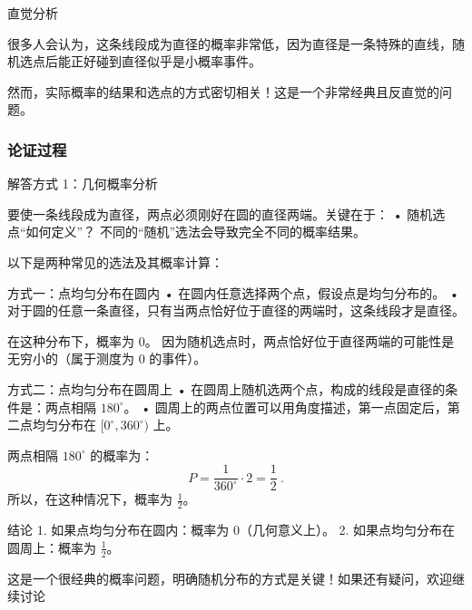 直觉分析

很多人会认为，这条线段成为直径的概率非常低，因为直径是一条特殊的直线，随机选点后能正好碰到直径似乎是小概率事件。

然而，实际概率的结果和选点的方式密切相关！这是一个非常经典且反直觉的问题。


\subsubsection{论证过程}
解答方式 1：几何概率分析

要使一条线段成为直径，两点必须刚好在圆的直径两端。关键在于：
	•	随机选点“如何定义”？
不同的“随机”选法会导致完全不同的概率结果。

以下是两种常见的选法及其概率计算：

方式一：点均匀分布在圆内
	•	在圆内任意选择两个点，假设点是均匀分布的。
	•	对于圆的任意一条直径，只有当两点恰好位于直径的两端时，这条线段才是直径。

在这种分布下，概率为 0。
因为随机选点时，两点恰好位于直径两端的可能性是无穷小的（属于测度为 0 的事件）。

方式二：点均匀分布在圆周上
	•	在圆周上随机选两个点，构成的线段是直径的条件是：两点相隔 $180^\circ$。
	•	圆周上的两点位置可以用角度描述，第一点固定后，第二点均匀分布在 $[0^\circ, 360^\circ)$ 上。

两点相隔 $180^\circ$ 的概率为：
$$
P = \frac{1}{360^\circ} \cdot 2 = \frac{1}{2}~.
$$
所以，在这种情况下，概率为 $\frac{1}{2}$。

结论
	1.	如果点均匀分布在圆内：概率为 $0$（几何意义上）。
	2.	如果点均匀分布在圆周上：概率为 $\frac{1}{2}$。

这是一个很经典的概率问题，明确随机分布的方式是关键！如果还有疑问，欢迎继续讨论~